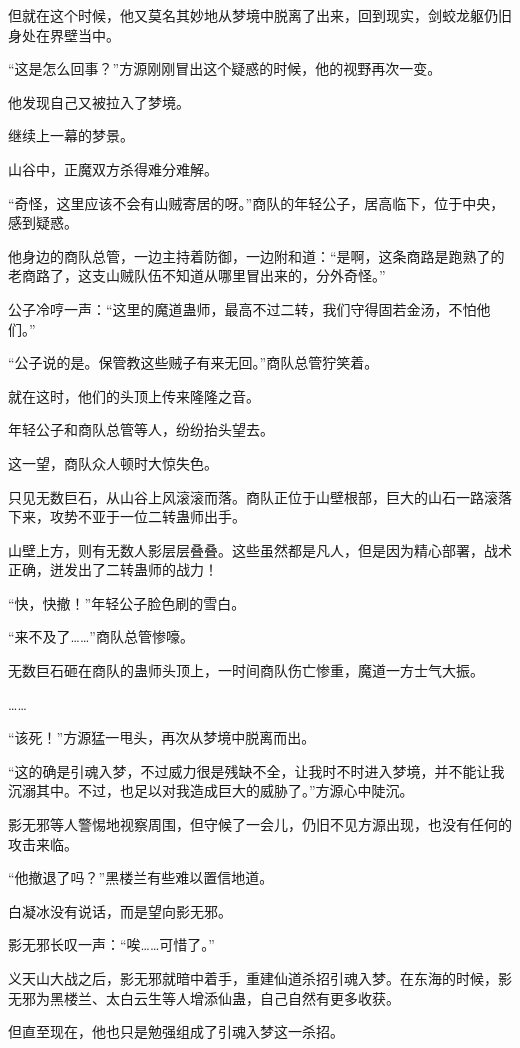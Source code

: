 \begin{this_body}
但就在这个时候，他又莫名其妙地从梦境中脱离了出来，回到现实，剑蛟龙躯仍旧身处在界壁当中。

“这是怎么回事？”方源刚刚冒出这个疑惑的时候，他的视野再次一变。

他发现自己又被拉入了梦境。

继续上一幕的梦景。

山谷中，正魔双方杀得难分难解。

“奇怪，这里应该不会有山贼寄居的呀。”商队的年轻公子，居高临下，位于中央，感到疑惑。

他身边的商队总管，一边主持着防御，一边附和道：“是啊，这条商路是跑熟了的老商路了，这支山贼队伍不知道从哪里冒出来的，分外奇怪。”

公子冷哼一声：“这里的魔道蛊师，最高不过二转，我们守得固若金汤，不怕他们。”

“公子说的是。保管教这些贼子有来无回。”商队总管狞笑着。

就在这时，他们的头顶上传来隆隆之音。

年轻公子和商队总管等人，纷纷抬头望去。

这一望，商队众人顿时大惊失色。

只见无数巨石，从山谷上风滚滚而落。商队正位于山壁根部，巨大的山石一路滚落下来，攻势不亚于一位二转蛊师出手。

山壁上方，则有无数人影层层叠叠。这些虽然都是凡人，但是因为精心部署，战术正确，迸发出了二转蛊师的战力！

“快，快撤！”年轻公子脸色刷的雪白。

“来不及了……”商队总管惨嚎。

无数巨石砸在商队的蛊师头顶上，一时间商队伤亡惨重，魔道一方士气大振。

……

“该死！”方源猛一甩头，再次从梦境中脱离而出。

“这的确是引魂入梦，不过威力很是残缺不全，让我时不时进入梦境，并不能让我沉溺其中。不过，也足以对我造成巨大的威胁了。”方源心中陡沉。

影无邪等人警惕地视察周围，但守候了一会儿，仍旧不见方源出现，也没有任何的攻击来临。

“他撤退了吗？”黑楼兰有些难以置信地道。

白凝冰没有说话，而是望向影无邪。

影无邪长叹一声：“唉……可惜了。”

义天山大战之后，影无邪就暗中着手，重建仙道杀招引魂入梦。在东海的时候，影无邪为黑楼兰、太白云生等人增添仙蛊，自己自然有更多收获。

但直至现在，他也只是勉强组成了引魂入梦这一杀招。


\end{this_body}

